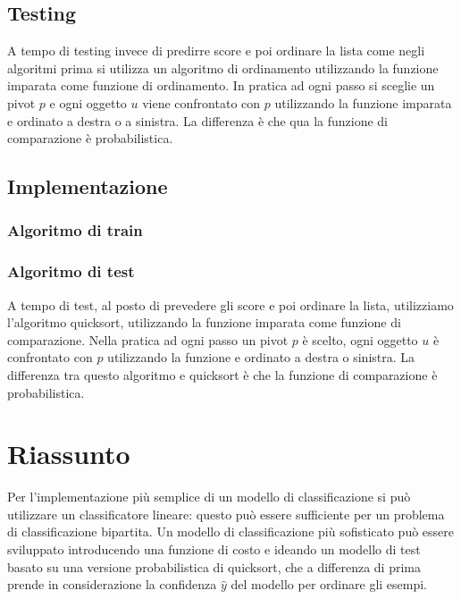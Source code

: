 	\subsection{Testing}
	A tempo di testing invece di predirre score e poi ordinare la lista come negli algoritmi prima si utilizza un algoritmo di ordinamento utilizzando la funzione imparata come funzione di ordinamento.
	In pratica ad ogni passo si sceglie un pivot $p$ e ogni oggetto $u$ viene confrontato con $p$ utilizzando la funzione imparata e ordinato a destra o a sinistra.
	La differenza \`e che qua la funzione di comparazione \`e probabilistica.

	\subsection{Implementazione}

		\subsubsection{Algoritmo di train}
		

		\subsubsection{Algoritmo di test}
		A tempo di test, al posto di prevedere gli score e poi ordinare la lista, utilizziamo l'algoritmo quicksort, utilizzando la funzione imparata come funzione di comparazione. Nella pratica ad ogni passo un pivot $p$ \`e scelto, ogni oggetto $u$ \`e confrontato con $p$ utilizzando la funzione e ordinato a destra o sinistra. La differenza tra questo algoritmo e quicksort \`e che la funzione di comparazione \`e probabilistica.
		
\section{Riassunto}

Per l'implementazione più semplice di un modello di classificazione si può utilizzare un classificatore lineare: questo può essere sufficiente per un problema di classificazione bipartita.
Un modello di classificazione più sofisticato può essere sviluppato introducendo una funzione di costo e ideando un modello di test basato su una versione probabilistica di quicksort, che a differenza di prima prende in considerazione la confidenza $\hat{y}$ del modello per ordinare gli esempi.
